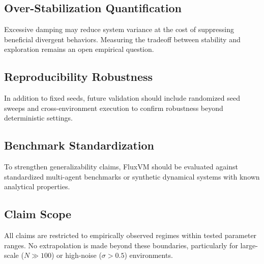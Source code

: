 \documentclass{article}
\begin{document}
\subsection*{Over-Stabilization Quantification}
Excessive damping may reduce system variance at the cost of suppressing beneficial divergent behaviors. Measuring the tradeoff between stability and exploration remains an open empirical question.

\subsection*{Reproducibility Robustness}
In addition to fixed seeds, future validation should include randomized seed sweeps and cross-environment execution to confirm robustness beyond deterministic settings.

\subsection*{Benchmark Standardization}
To strengthen generalizability claims, FluxVM should be evaluated against standardized multi-agent benchmarks or synthetic dynamical systems with known analytical properties.

\subsection*{Claim Scope}
All claims are restricted to empirically observed regimes within tested parameter ranges. No extrapolation is made beyond these boundaries, particularly for large-scale ($N \gg 100$) or high-noise ($\sigma > 0.5$) environments.



\end{document}

